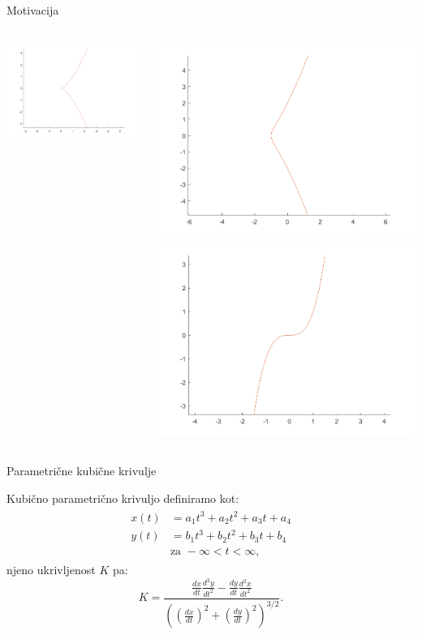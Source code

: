 \documentclass{beamer} %
\begin{document}
\begin{frame}{Motivacija}
\begin{columns}[T]
\begin{center}
	\includegraphics[width=0.6\columnwidth]{cusp.png}
	\end{center}
	\begin{center}
	\includegraphics[width=0.6\columnwidth]{prevoj.png}
	\includegraphics[width=0.6\columnwidth]{no_sing.png}
\end{center}
\end{columns}

\end{frame}

\begin{frame} {Parametrične kubične krivulje}

Kubično parametrično krivuljo definiramo kot:
	\begin{align}
	\begin{split}
	x(t) &= a_1t^3+a_2t^2+a_3t+a_4 \\
	y(t) &= b_1t^3+b_2t^2+b_3t+b_4 \\
	&\text {za } -\infty < t < \infty \text{,}
	\label{param}
	\end{split}
	\end{align}
	njeno ukrivljenost $K$ pa:
	\[K = \frac{\frac{dx}{dt}\frac{d^2y}{dt^2} - \frac{dy}{dt}\frac{d^2x}{dt^2}}{\left((\frac{dx}{dt})^{2} +(\frac{dy}{dt})^2\right)^{3/2}}\text{.}\]

\end{frame}
\end{document}

